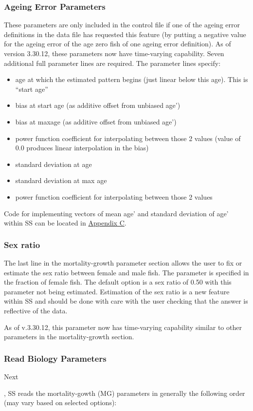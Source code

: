 \subsubsection{Ageing Error Parameters}
These parameters are only included in the control file if one of the ageing error definitions in the data file has requested this feature (by putting a negative value for the ageing error of the age zero fish of one ageing error definition). As of version 3.30.12, these parameters now have time-varying capability. Seven additional full parameter lines are required. The parameter lines specify:
\begin{itemize}
	\item age at which the estimated pattern begins (just linear below this age).  This is “start age”
	\item bias at start age (as additive offset from unbiased age’)
	\item bias at maxage (as additive offset from unbiased age’)
	\item power function coefficient for interpolating between those 2 values (value of 0.0 produces linear interpolation in the bias)
	\item standard deviation at age
	\item standard deviation at max age
	\item power function coefficient for interpolating between those 2 values
\end{itemize}

\noindent Code for implementing vectors of mean age' and standard deviation of age' within SS can be located in \hyperlink{AgeingError}{Appendix C}.

\subsubsection{Sex ratio}
The last line in the mortality-growth parameter section allows the user to fix or estimate the sex ratio between female and male fish.  The parameter is specified in the fraction of female fish. The default option is a sex ratio of 0.50 with this parameter not being estimated.  Estimation of the sex ratio is a new feature within SS and should be done with care with the user checking that the answer is reflective of the data.  

As of v.3.30.12, this parameter now has time-varying capability similar to other parameters in the mortality-growth section.

\subsubsection{Read Biology Parameters}
\hypertarget{MGorder}{Next}, SS reads the mortality-gowth (MG) parameters in generally the following order (may vary based on selected options):


